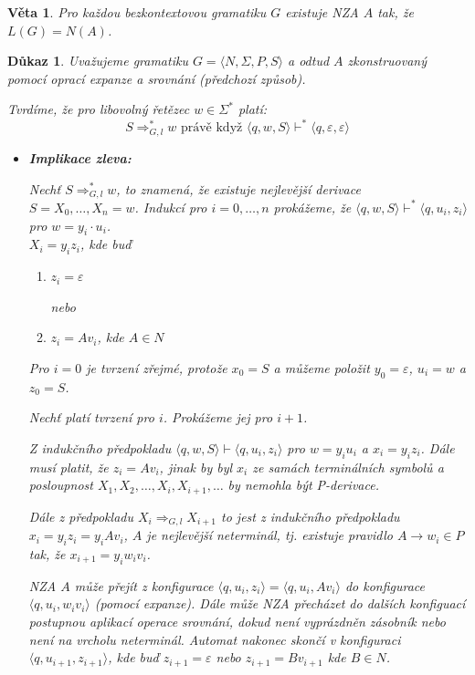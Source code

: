 \documentclass[10pt, a4paper, titlepage]{article}
\theoremstyle{note}
\newtheorem{veta}{Věta}
\newtheorem{dukaz}{Důkaz}
\begin{document}
\begin{veta}
Pro každou bezkontextovou gramatiku $G$ existuje NZA $A$ tak, že $L(G)=N(A)$.
\end{veta}

\begin{dukaz}
Uvažujeme gramatiku $G=\langle N,\Sigma,P,S \rangle$ a odtud $A$ zkonstruovaný pomocí oprací expanze a srovnání (předchozí způsob).

Tvrdíme, že pro libovolný řetězec $w \in \Sigma^*$ platí:
$$
S \Rightarrow_{G,l}^* w \text{ právě když } \langle q,w,S \rangle \vdash^* \langle q,\varepsilon,\varepsilon \rangle
$$

\begin{itemize}
\item
\textbf{Implikace zleva:}

Nechť $S \Rightarrow_{G,l}^* w$, to znamená, že existuje nejlevější derivace $S=X_0,\ldots,X_n=w$. Indukcí pro $i=0,\ldots,n$ prokážeme, že $\langle q,w,S \rangle \vdash^* \langle q,u_i,z_i \rangle$ pro $w = y_i\cdot u_i$. \\
$X_i=y_iz_i$, kde buď 
\begin{enumerate}
\item
$z_i = \varepsilon$

nebo
\item
$z_i=Av_i$, kde $A \in N$
\end{enumerate}

Pro $i=0$ je tvrzení zřejmé, protože $x_0=S$ a můžeme položit $y_0=\varepsilon$, $u_i=w$ a $z_0=S$.

Nechť platí tvrzení pro $i$. Prokážeme jej pro $i+1$.

Z indukčního předpokladu $\langle q,w,S \rangle \vdash \langle q,u_i,z_i \rangle$ pro $w=y_iu_i$ a $x_i=y_iz_i$. Dále musí platit, že $z_i=Av_i$, jinak by byl $x_i$ ze samách terminálních symbolů a posloupnost $X_1,X_2,\ldots,X_i,X_{i+1},\ldots$ by nemohla být P-derivace.

Dále z předpokladu $X_i \Rightarrow_{G,l}X_{i+1}$ to jest z indukčního předpokladu $x_i=y_iz_i=y_iAv_i$, $A$ je nejlevější neterminál, tj. existuje pravidlo $A \rightarrow w_i \in P$ tak, že $x_{i+1}=y_iw_iv_i$.

NZA $A$ může přejít z konfigurace $\langle q,u_i,z_i \rangle = \langle q,u_i,Av_i \rangle$ do konfigurace $\langle q,u_i,w_iv_i \rangle$ (pomocí expanze). Dále může NZA přecházet do dalších konfiguací postupnou aplikací operace srovnání, dokud není vyprázdněn zásobník nebo není na vrcholu neterminál.
Automat nakonec skončí v konfiguraci $\langle q,u_{i+1},z_{i+1} \rangle$, kde buď $z_{i+1}=\varepsilon$ nebo $z_{i+1}=Bv_{i+1}$ kde $B \in N$.


\end{itemize}
\end{dukaz}
\end{document}
